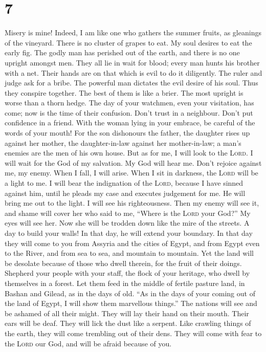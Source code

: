 \hypertarget{section-6}{%
\section{7}\label{section-6}}

 Misery is mine! Indeed, I am like one who gathers the
summer fruits, as gleanings of the vineyard. There is no cluster of
grapes to eat. My soul desires to eat the early fig.  The
godly man has perished out of the earth, and there is no one upright
amongst men. They all lie in wait for blood; every man hunts his brother
with a net.  Their hands are on that which is evil to do
it diligently. The ruler and judge ask for a bribe. The powerful man
dictates the evil desire of his soul. Thus they conspire together.
 The best of them is like a brier. The most upright is
worse than a thorn hedge. The day of your watchmen, even your
visitation, has come; now is the time of their confusion. 
Don't trust in a neighbour. Don't put confidence in a friend. With the
woman lying in your embrace, be careful of the words of your mouth!
 For the son dishonours the father, the daughter rises up
against her mother, the daughter-in-law against her mother-in-law; a
man's enemies are the men of his own house.  But as for
me, I will look to the \textsc{Lord}. I will wait for the God of my
salvation. My God will hear me.  Don't rejoice against me,
my enemy. When I fall, I will arise. When I sit in darkness, the
\textsc{Lord} will be a light to me.  I will bear the
indignation of the \textsc{Lord}, because I have sinned against him,
until he pleads my case and executes judgement for me. He will bring me
out to the light. I will see his righteousness.  Then my
enemy will see it, and shame will cover her who said to me, ``Where is
the \textsc{Lord} your God?'' My eyes will see her. Now she will be
trodden down like the mire of the streets.  A day to
build your walls! In that day, he will extend your boundary.
 In that day they will come to you from Assyria and the
cities of Egypt, and from Egypt even to the River, and from sea to sea,
and mountain to mountain.  Yet the land will be desolate
because of those who dwell therein, for the fruit of their doings.
 Shepherd your people with your staff, the flock of your
heritage, who dwell by themselves in a forest. Let them feed in the
middle of fertile pasture land, in Bashan and Gilead, as in the days of
old.  ``As in the days of your coming out of the land of
Egypt, I will show them marvellous things.''  The nations
will see and be ashamed of all their might. They will lay their hand on
their mouth. Their ears will be deaf.  They will lick the
dust like a serpent. Like crawling things of the earth, they will come
trembling out of their dens. They will come with fear to the
\textsc{Lord} our God, and will be afraid because of you.

